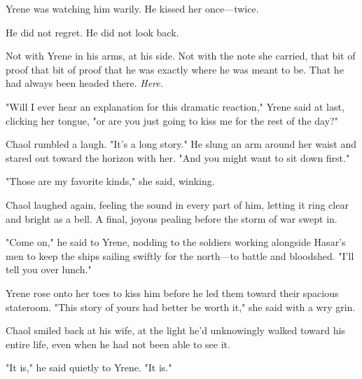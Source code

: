 Yrene was watching him warily. He kissed her once---twice.

He did not regret. He did not look back.

Not with Yrene in his arms, at his side. Not with the note she carried, that bit of proof  that bit of proof that he was exactly where he was meant to be. That he had always been headed there. \emph{Here.}

"Will I ever hear an explanation for this dramatic reaction," Yrene said at last, clicking her tongue, "or are you just going to kiss me for the rest of the day?"

Chaol rumbled a laugh. "It's a long story." He slung an arm around her waist and stared out toward the horizon with her. "And you might want to sit down first."

"Those are my favorite kinds," she said, winking.

Chaol laughed again, feeling the sound in every part of him, letting it ring clear and bright as a bell. A final, joyous pealing before the storm of war swept in.

"Come on," he said to Yrene, nodding to the soldiers working alongside Hasar's men to keep the ships sailing swiftly for the north---to battle and bloodshed. "I'll tell you over lunch."

Yrene rose onto her toes to kiss him before he led them toward their spacious stateroom. "This story of yours had better be worth it," she said with a wry grin.

Chaol smiled back at his wife, at the light he'd unknowingly walked toward his entire life, even when he had not been able to see it.

"It is," he said quietly to Yrene. "It is."

